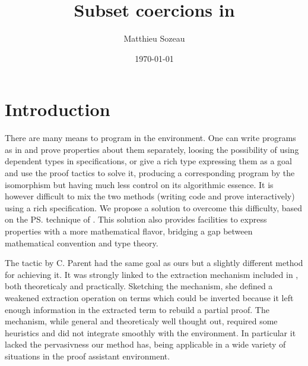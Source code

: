 \documentclass{llncs}
\author{Matthieu Sozeau\inst{1}}
\institute{LRI, Paris Sud XI University\\\email{sozeau@lri.fr}}
\title{Subset coercions in \Coq}
\date{\today}
\begin{document}
\maketitle


\section{Introduction}
There are many means to program in the \Coq{} environment. One
can write programs as in \ML{} and prove properties about them
separately, loosing the possibility of using dependent types in
specifications, or give a rich type expressing them as a goal and use the
proof tactics to solve it, producing a corresponding program by the
\CurryHoward isomorphism but having much less control on its algorithmic
essence. It is however difficult to mix the two methods
(writing code and prove interactively) using a rich specification. We
propose a solution to overcome this difficulty, based on the \ps{}
\cite{Shankar&Owre:WADT99} technique of \PVS{}
\cite{PVS:Language,PVS-Semantics:TR}. This solution also provides
facilities to express properties with a more mathematical flavor,
bridging a gap between mathematical convention and type theory.

The \Program{} tactic by C. Parent \cite{conf/mpc/Parent95} had the same
goal as ours but a slightly different method for achieving it. It was strongly
linked to the extraction mechanism included in \Coq, both theoreticaly
and practically. Sketching the mechanism, she defined a weakened
extraction operation on \CIC{} terms which could be inverted because it left enough
information in the extracted term to rebuild a partial proof. The
mechanism, while general and theoreticaly well thought out, required
some heuristics and did not integrate smoothly with the \Coq{}
environment. In particular it lacked the pervasivness our method has,
being applicable in a wide variety of situations in the proof assistant
environment.
\end{document}
